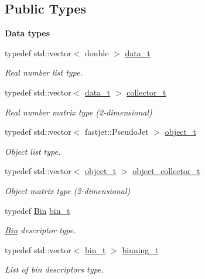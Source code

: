 \subsection*{Public Types}
\begin{Indent}{\bf Data types}\par
\begin{DoxyCompactItemize}
\item 
typedef std\+::vector$<$ double $>$ \hyperlink{classSlidingWindow_1_1Window_abc07b028eea17a8713e74a556b9d1ad2}{data\+\_\+t}
\begin{DoxyCompactList}\small\item\em Real number list type. \end{DoxyCompactList}\item 
typedef std\+::vector$<$ \hyperlink{classSlidingWindow_1_1Window_abc07b028eea17a8713e74a556b9d1ad2}{data\+\_\+t} $>$ \hyperlink{classSlidingWindow_1_1Window_a86da88957da29f042341ff4b0413316e}{collector\+\_\+t}
\begin{DoxyCompactList}\small\item\em Real number matrix type (2-\/dimensional) \end{DoxyCompactList}\item 
typedef std\+::vector$<$ fastjet\+::\+Pseudo\+Jet $>$ \hyperlink{classSlidingWindow_1_1Window_a0ee13c18faf2f2ec3855b6449ef765e0}{object\+\_\+t}
\begin{DoxyCompactList}\small\item\em Object list type. \end{DoxyCompactList}\item 
typedef std\+::vector$<$ \hyperlink{classSlidingWindow_1_1Window_a0ee13c18faf2f2ec3855b6449ef765e0}{object\+\_\+t} $>$ \hyperlink{classSlidingWindow_1_1Window_a3883a474287703a42cf8971ba8ef6884}{object\+\_\+collector\+\_\+t}
\begin{DoxyCompactList}\small\item\em Object matrix type (2-\/dimensional) \end{DoxyCompactList}\item 
typedef \hyperlink{classSlidingWindow_1_1Bin}{Bin} \hyperlink{classSlidingWindow_1_1Window_a9bbfc142a52e17a3e1c51093edfe936f}{bin\+\_\+t}
\begin{DoxyCompactList}\small\item\em \hyperlink{classSlidingWindow_1_1Bin}{Bin} descriptor type. \end{DoxyCompactList}\item 
typedef std\+::vector$<$ \hyperlink{classSlidingWindow_1_1Window_a9bbfc142a52e17a3e1c51093edfe936f}{bin\+\_\+t} $>$ \hyperlink{classSlidingWindow_1_1Window_a71c711c04a16a1f32a9731f80e73b5e8}{binning\+\_\+t}
\begin{DoxyCompactList}\small\item\em List of bin descriptors type. \end{DoxyCompactList}\end{DoxyCompactItemize}
\end{Indent}

